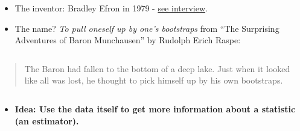 \documentclass[10pt,ignorenonframetext,]{beamer}
\providecommand{\tightlist}{%
  \setlength{\itemsep}{0pt}\setlength{\parskip}{0pt}}
\begin{document}
\begin{frame}

\begin{itemize}
\item
  The inventor: Bradley Efron in 1979 -
  \href{https://www.youtube.com/watch?v=6l9V1sINzhE}{see interview}.
\item
  The name? \emph{To pull oneself up by one's bootstraps} from ``The
  Surprising Adventures of Baron Munchausen'' by Rudolph Erich Raspe:
\end{itemize}

\(~\)

\begin{quote}
The Baron had fallen to the bottom of a deep lake. Just when it looked
like all was lost, he thought to pick himself up by his own bootstraps.
\end{quote}

\(~\)

\begin{itemize}
\tightlist
\item
  \textbf{Idea: Use the data itself to get more information about a
  statistic (an estimator).}
\end{itemize}

\end{frame}
\end{document}
